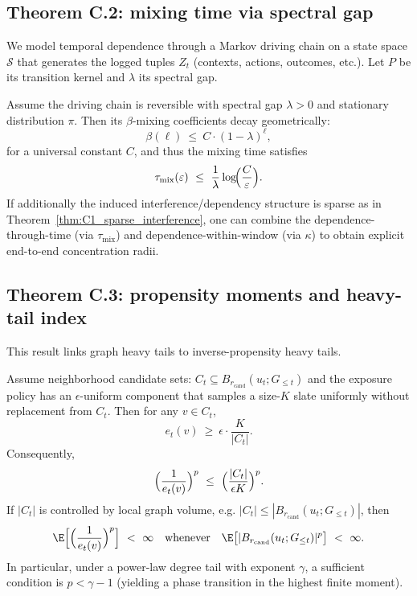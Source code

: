 \documentclass[12pt,a4paper]{article}
\begin{document}
\subsection{Theorem C.2: mixing time via spectral gap}
\label{subsec:C2}

We model temporal dependence through a Markov driving chain on a state space $\mathcal{S}$
that generates the logged tuples $Z_t$ (contexts, actions, outcomes, etc.).
Let $P$ be its transition kernel and $\lambda$ its spectral gap.

\begin{theorem}
\label{thm:C2_mixing_spectral}
Assume the driving chain is reversible with spectral gap $\lambda>0$ and stationary distribution $\pi$.
Then its $\beta$-mixing coefficients decay geometrically:
\[
\beta(\ell)\ \le\ C \cdot (1-\lambda)^\ell,
\]
for a universal constant $C$, and thus the mixing time satisfies
\[
\tau_{\mathrm{mix}}(\varepsilon)\ \le\ \frac{1}{\lambda}\log\!\Bigl(\frac{C}{\varepsilon}\Bigr).
\]
If additionally the induced interference/dependency structure is sparse as in Theorem~\ref{thm:C1_sparse_interference},
one can combine the dependence-through-time (via $\tau_{\mathrm{mix}}$) and dependence-within-window
(via $\kappa$) to obtain explicit end-to-end concentration radii.
\end{theorem}



\subsection{Theorem C.3: propensity moments and heavy-tail index}
\label{subsec:C3}

This result links graph heavy tails to inverse-propensity heavy tails.

\begin{theorem}
\label{thm:C3_propensity_moments}
Assume neighborhood candidate sets: $C_t \subseteq B_{r_{\mathrm{cand}}}(u_t;G_{\le t})$
and the exposure policy has an $\epsilon$-uniform component that samples a size-$K$ slate
uniformly without replacement from $C_t$.
Then for any $v\in C_t$,
\[
e_t(v)\ \ge\ \epsilon\cdot \frac{K}{|C_t|}.
\]
Consequently,
\[
\Bigl(\frac{1}{e_t(v)}\Bigr)^p \ \le\ \Bigl(\frac{|C_t|}{\epsilon K}\Bigr)^p.
\]
If $|C_t|$ is controlled by local graph volume, e.g. $|C_t|\le |B_{r_{\mathrm{cand}}}(u_t;G_{\le t})|$,
then
\[
\E\Bigl[\Bigl(\frac{1}{e_t(v)}\Bigr)^p\Bigr]\ <\ \infty
\quad \text{whenever}\quad
\E\bigl[|B_{r_{\mathrm{cand}}}(u_t;G_{\le t})|^p\bigr]\ <\ \infty.
\]
In particular, under a power-law degree tail with exponent $\gamma$,
a sufficient condition is $p<\gamma-1$ (yielding a phase transition in the highest finite moment).
\end{theorem}
\end{document}
